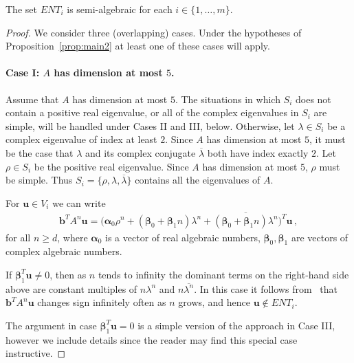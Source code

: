 \begin{proposition}
The set $\mathit{ENT}_i$ is semi-algebraic for each $i\in \{1,\ldots,m\}$.
\label{prop:semi-alg}
\end{proposition}
\begin{proof}
  We consider three (overlapping) cases.  Under the hypotheses of
  Proposition~\ref{prop:main2} at least one of these cases will apply.

\paragraph{Case I: $A$ has dimension at most $5$.}
Assume that $A$ has dimension at most $5$.  The situations in which
$S_i$ does not contain a positive real eigenvalue, or
all of the complex eigenvalues in $S_i$ are simple, will be handled
under Cases II and III, below.  Otherwise, let $\lambda\in S_i$ be a complex
eigenvalue of index at least $2$.  Since $A$ has dimension at most
$5$, it must be the case that $\lambda$ and its complex conjugate
$\overline{\lambda}$ both have index exactly $2$.  Let $\rho \in S_i$
be the positive real eigenvalue.  Since
$A$ has dimension at most $5$, $\rho$ must be simple.  Thus
$S_i=\{\rho,\lambda,\overline{\lambda}\}$ contains all the eigenvalues
of $A$.

For $\boldsymbol{u}\in V_i$ we can write
\begin{align*}
\boldsymbol{b}^TA^n\boldsymbol{u} =
\big(\boldsymbol{\alpha}_0\rho^n  + (\boldsymbol{\beta}_0+ \boldsymbol{\beta}_1n)\lambda^n
 + \overline{(\boldsymbol{\beta}_0+\boldsymbol{\beta}_1n)
\lambda^n}\big)^T\boldsymbol{u} \, ,
\label{eq:small}
\end{align*}
for all $n\geq d$,
where $\boldsymbol{\alpha}_0$ is a vector of real algebraic numbers,
$\boldsymbol{\beta}_0,\boldsymbol{\beta}_1$ are vectors of complex
algebraic numbers.

If $\boldsymbol{\beta}_1^T\boldsymbol{u}\neq 0$, then as $n$ tends to
infinity the dominant terms on the right-hand side above are constant
multiples of $n\lambda^n$ and $n\overline{\lambda^n}$.  In this case
it follows from~\cite[Lemma 4]{Bra06} that
$\boldsymbol{b}^TA^n\boldsymbol{u}$ changes sign infinitely often as
$n$ grows, and hence $\boldsymbol{u}\not\in\mathit{ENT}_i$.

The argument in case $\boldsymbol{\beta}_1^T\boldsymbol{u}=0$ is a
simple version of the approach in Case III, however we include details
since the reader may find this special case instructive.


\end{proof}
